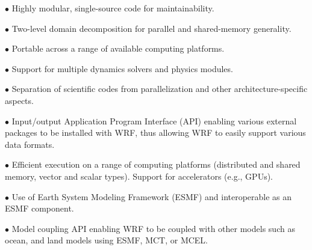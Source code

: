 \begin{description}
\setlength{\itemsep}{-5pt}
\item{$\bullet$} Highly modular, single-source code for maintainability.
%
\item{$\bullet$} Two-level domain decomposition for parallel and 
shared-memory generality.
%
\item{$\bullet$} Portable across a range of available computing platforms.
%
\item{$\bullet$} Support for multiple dynamics solvers and physics modules.
%
\item{$\bullet$}
Separation of scientific codes from parallelization and other 
architecture-specific aspects.
%
\item{$\bullet$}
Input/output Application Program Interface (API) enabling various external
packages to be installed with WRF, thus allowing WRF
to easily support various data formats.
%
\item{$\bullet$}
Efficient execution on a range of computing platforms
(distributed and shared memory, vector
and scalar types). Support for accelerators (e.g., GPUs).
%
\item{$\bullet$}
Use of Earth System Modeling Framework (ESMF) and interoperable as an ESMF
component.
%
\item{$\bullet$}
Model coupling API enabling WRF to be coupled with other models such as
ocean, and land models using ESMF, MCT, or MCEL.
\end{description}
